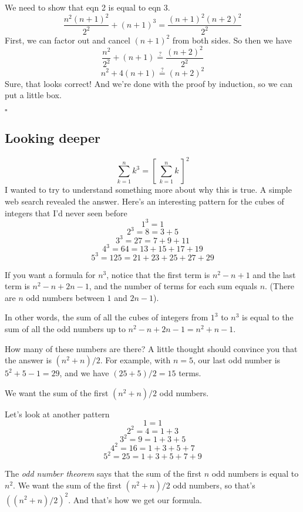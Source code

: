 \documentclass[11pt, oneside]{article}
\begin{document}
We need to show that eqn 2 is equal to eqn 3.  
\[ \frac{n^2(n+1)^2}{2^2} + (n+1)^3 = \frac{(n+1)^2(n+2)^2}{2^2} \]
First, we can factor out and cancel $(n+1)^2$ from both sides.  So then we have
\[ \frac{n^2}{2^2} + (n+1) \stackrel{?}{=} \frac{(n+2)^2}{2^2} \]
\[ n^2 + 4(n+1) \stackrel{?}{=} (n+2)^2 \]
Sure, that looks correct!  And we're done with the proof by induction, so we can put a little box.

$\square$

\subsection*{Looking deeper}
\[ \sum\limits_{k=1}^n k^3 = [\ \sum\limits_{k=1}^n k \ ] ^2 \]
I wanted to try to understand something more about why this is true.  A simple web search revealed the answer.  Here's an interesting pattern for the cubes of integers that I'd never seen before
\[ 1^3 = 1 \]
\[ 2^3 = 8 = 3 + 5 \]
\[ 3^3 = 27 = 7 + 9 + 11 \]
\[ 4^3 = 64 = 13 + 15 + 17 + 19 \]
\[ 5^3 = 125 = 21 + 23 + 25 + 27 + 29  \]

If you want a formula for $n^3$, notice that the first term is $n^2 - n + 1$ and the last term is $n^2 - n + 2n - 1$, and the number of terms for each sum equals $n$.  (There are $n$ odd numbers between $1$ and $2n-1$).

In other words, the sum of all the cubes of integers from $1^3$ to $n^3$ is equal to the sum of all the odd numbers up to $n^2 - n + 2n - 1 = n^2 + n - 1$.

How many of these numbers are there?  A little thought should convince you that the answer is $(n^2 + n)/2$.  For example, with $n=5$, our last odd number is $5^2 + 5 - 1 = 29$, and we have $(25 + 5)/2 = 15$ terms.

We want the sum of the first $(n^2 + n)/2$ odd numbers.

Let's look at another pattern
\[ 1 = 1 \]
\[ 2^2 = 4 = 1 + 3 \]
\[ 3^2 = 9 = 1 + 3 + 5 \]
\[ 4^2 = 16 = 1 + 3 + 5 + 7 \]
\[ 5^2 = 25 = 1 + 3 + 5 + 7 + 9 \]

The \emph{odd number theorem} says that the sum of the first $n$ odd numbers is equal to $n^2$.  We want the sum of the first $(n^2 + n)/2$ odd numbers, so that's $((n^2 + n)/2)^2$.  And that's how we get our formula.
\end{document}

